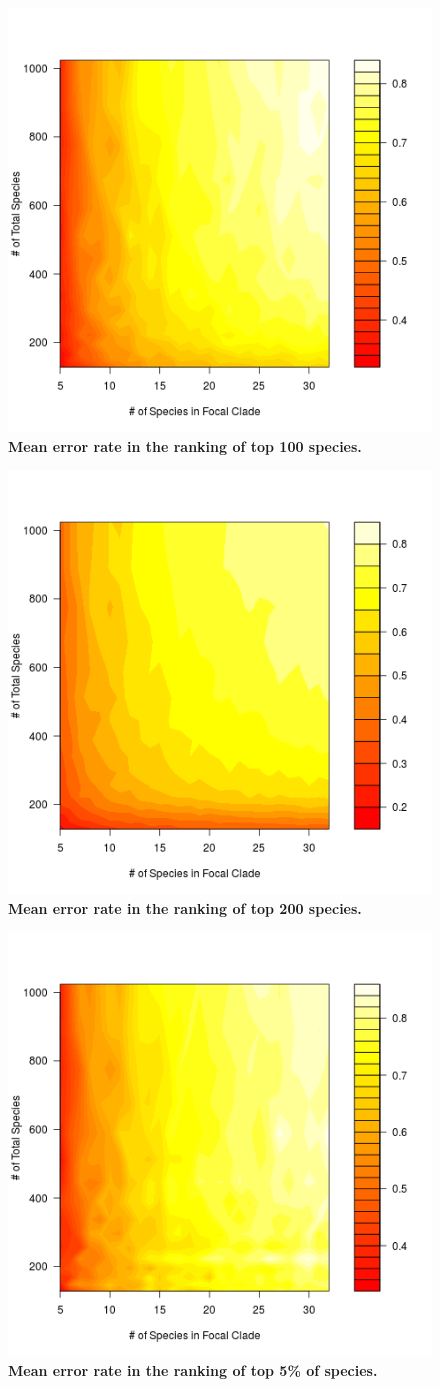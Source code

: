 \documentclass[12pt,english]{article}
\begin{document}
\begin{figure}[!ht]
  \center
  \includegraphics[width=.5\textwidth]{errorRate100.png}
  \caption{\textbf{Mean error rate in the ranking of top 100 species.} }
\end{figure}

\begin{figure}[!ht]
  \center
  \includegraphics[width=.5\textwidth]{errorRate200.png}
  \caption{\textbf{Mean error rate in the ranking of top 200 species.} }
\end{figure}

\begin{figure}[!ht]
  \center
  \includegraphics[width=.5\textwidth]{errorRate5pct.png}
  \caption{\textbf{Mean error rate in the ranking of top 5\% of species.} }
\end{figure}
\end{document}
